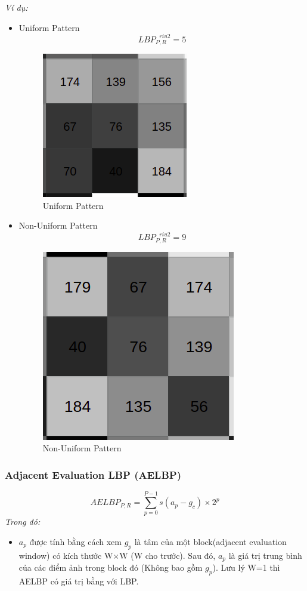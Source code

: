 \textit{Ví dụ:}
\begin{itemize}
	\item Uniform Pattern 
	$$
		LBP_{P,R}^{\text{  }riu2} = 5
	$$
	\begin{figure}[H]
		\begin{center}
			\includegraphics[scale=0.65]{images/theo1/LBP_exam4}
			\caption{Uniform Pattern}
		\end{center}
	\end{figure}
	\item Non-Uniform Pattern
	$$
		LBP_{P,R}^{\text{  }riu2} = 9
	$$
	\begin{figure}[H]
		\begin{center}
			\includegraphics[scale=0.5]{images/theo1/LBP_exam1}
			\caption{Non-Uniform Pattern}
		\end{center}
	\end{figure}
\end{itemize}

\subsubsection{Adjacent Evaluation LBP (AELBP)}
\begin{equation}
	AELBP_{P,R}=\sum_{p=0}^{P-1}{s(a_p-g_c)\times 2^p}
\end{equation}
\textit{Trong đó:}
\begin{itemize}
	\item $a_p$ được tính bằng cách xem $g_p$ là tâm của một block(adjacent evaluation window) có kích thước W$\times$W (W cho trước). Sau đó, $a_p$ là giá trị trung bình của các điểm ảnh trong block đó (Không bao gồm $g_p$). Lưu lý W=1 thì AELBP có giá trị bằng với LBP.
\end{itemize}

